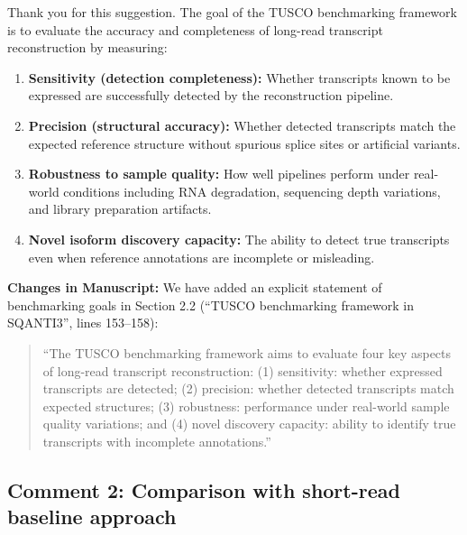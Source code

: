 \documentclass[11pt]{article}
\begin{document}
\begin{responseboxnew}
    Thank you for this suggestion. The goal of the TUSCO benchmarking framework is to evaluate the accuracy and completeness
    of long-read transcript reconstruction by measuring:

    \begin{enumerate}
      \item \textbf{Sensitivity (detection completeness):} Whether transcripts
        known to be expressed are successfully detected by the reconstruction
        pipeline.

      \item \textbf{Precision (structural accuracy):} Whether detected
        transcripts match the expected reference structure without spurious
        splice sites or artificial variants.

      \item \textbf{Robustness to sample quality:} How well pipelines perform
        under real-world conditions including RNA degradation, sequencing depth variations,
        and library preparation artifacts.

      \item \textbf{Novel isoform discovery capacity:} The ability to detect
        true transcripts even when reference annotations are incomplete or
        misleading.
    \end{enumerate}

    \vspace{0.3cm}
    \textbf{Changes in Manuscript:} We have added an explicit statement of benchmarking
    goals in Section 2.2 (``TUSCO benchmarking framework in SQANTI3'', lines 153--158):
    \begin{quote}
      ``The TUSCO benchmarking framework aims to evaluate four key aspects of long-read transcript
      reconstruction: (1) sensitivity: whether expressed transcripts are
      detected; (2) precision: whether detected transcripts match expected structures;
      (3) robustness: performance under real-world sample quality variations; and
      (4) novel discovery capacity: ability to identify true transcripts with incomplete
      annotations.''
    \end{quote}
\end{responseboxnew}

\subsection{Comment 2: Comparison with short-read baseline approach}
\end{document}
